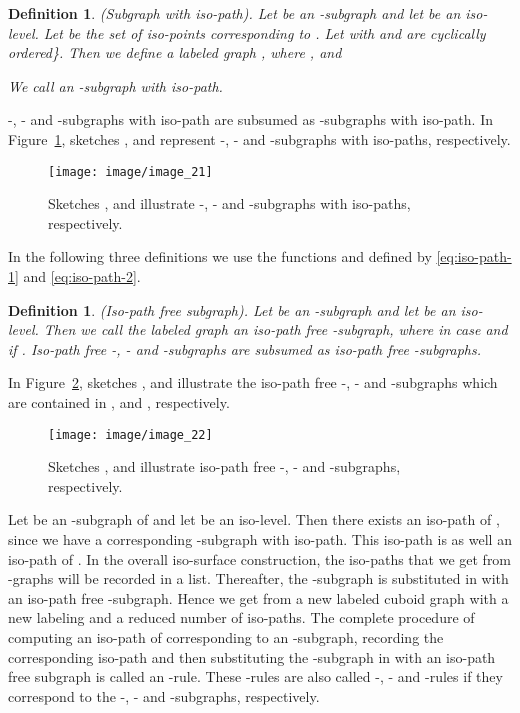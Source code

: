 \documentclass[a4paper,11pt]{article}
\newtheorem{definition}[theorem]{Definition}
\begin{document}
\begin{definition}(Subgraph with iso-path).
Let  be an -subgraph and let  be an iso-level.
Let  be the set of iso-points
corresponding to . Let  with  and
 are cyclically ordered\}. Then we define a labeled graph
, where ,  and

We call  an -subgraph with iso-path.
\label{def:iso-path-14}
\end{definition}
\noindent -, - and -subgraphs with iso-path are subsumed as -subgraphs with iso-path.
In Figure~\ref{image_21}, sketches ,  and  represent -, - and
-subgraphs with iso-paths, respectively.
\begin{figure}[!ht]
\texttt{[image: image/image\_21]}
\caption{Sketches ,  and  illustrate -, - and -subgraphs with
iso-paths, respectively.}
\label{image_21}
\end{figure}
\FloatBarrier
In the following three definitions we use the functions  and  defined by \eqref{eq:iso-path-1} and
\eqref{eq:iso-path-2}.
\begin{definition}(Iso-path free subgraph).
Let  be an -subgraph  and let  be an iso-level.
Then we call the labeled graph  an iso-path free -subgraph, where
 in case  and  if
. Iso-path free -, - and -subgraphs are subsumed as iso-path free -subgraphs.
\label{def:iso-path-16-17-18}
\end{definition}

In Figure~\ref{image_22}, sketches ,  and  illustrate the iso-path
free \mbox{-,} - and -subgraphs which are contained in , 
and , respectively.
\begin{figure}[!ht]
\texttt{[image: image/image\_22]}
\caption{Sketches ,  and  illustrate iso-path free -, -
and -subgraphs, respectively.}
\label{image_22}
\end{figure}
\FloatBarrier
Let  be an -subgraph of  and let  be
an iso-level. Then there exists an iso-path of , since we have a corresponding -subgraph with
iso-path. This iso-path is as well an iso-path of . In the overall iso-surface construction,
the iso-paths that we get from -graphs will be recorded in a list. Thereafter, the -subgraph
is substituted in  with an iso-path free -subgraph. Hence we get from  a new labeled cuboid
graph  with a new labeling and a reduced number of iso-paths. The complete
procedure of computing an iso-path of  corresponding to an -subgraph, recording the corresponding
iso-path and then substituting the -subgraph in  with an iso-path free subgraph is called
an -rule. These -rules are also called -, - and -rules if they correspond to
the -, - and -subgraphs, respectively.
\end{document}
